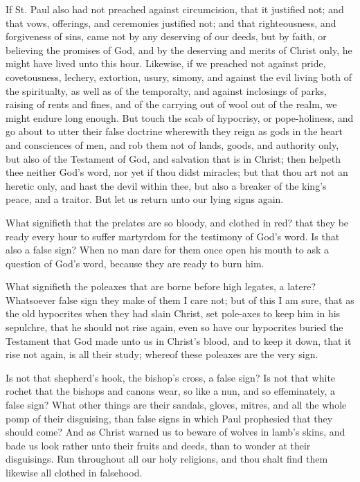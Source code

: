 If St. Paul also had not preached against circumcision, 
that it justified not; and that vows, offerings, and ceremonies
justified not; and that righteousness, and forgiveness
of sins, came not by any deserving of our deeds, 
but by faith, or believing the promises of God, and by the 
deserving and merits of Christ only, he might have lived 
unto this hour. Likewise, if we preached not against 
pride, covetousness, lechery, extortion, usury, simony, 
and against the evil living both of the spiritualty, as well 
as of the temporalty, and against inclosings of parks, 
raising of rents and fines, and of the carrying out of wool 
out of the realm, we might endure long enough. But 
touch the scab of hypocrisy, or pope-holiness, and go 
about to utter their false doctrine wherewith they reign as 
gods in the heart and consciences of men, and rob them 
not of lands, goods, and authority only, but also of the 
Testament of God, and salvation that is in Christ; then 
helpeth thee neither God's word, nor yet if thou didst 
miracles; but that thou art not an heretic only, and hast 
the devil within thee, but also a breaker of the king's 
peace, and a traitor. But let us return unto our lying 
signs again. 

What signifieth that the prelates are so bloody, and 
clothed in red? that they be ready every hour to suffer 
martyrdom for the testimony of God's word. Is that also 
a false sign? When no man dare for them once open 
his mouth to ask a question of God's word, because they 
are ready to burn him. 

What signifieth the poleaxes that are borne before 
high legates, a latere? Whatsoever false sign they make of 
them I care not; but of this I am sure, that as the old 
hypocrites when they had slain Christ, set pole-axes to 
keep him in his sepulchre, that he should not rise again, 
even so have our hypocrites buried the Testament that 
God made unto us in Christ's blood, and to keep it 
down, that it rise not again, is all their study; whereof 
these poleaxes are the very sign. 

Is not that shepherd's hook, the bishop's cross, a false 
sign? Is not that white rochet that the bishops and 
canons wear, so like a nun, and so effeminately, a false 
sign? What other things are their sandals, gloves, mitres, 
and all the whole pomp of their disguising, than false signs 
in which Paul prophesied that they should come? And 
as Christ warned us to beware of wolves in lamb's skins,
and bade us look rather unto their fruits and deeds, than
to wonder at their disguisings. Run throughout all our
holy religions, and thou shalt find them likewise all 
clothed in falsehood. 



